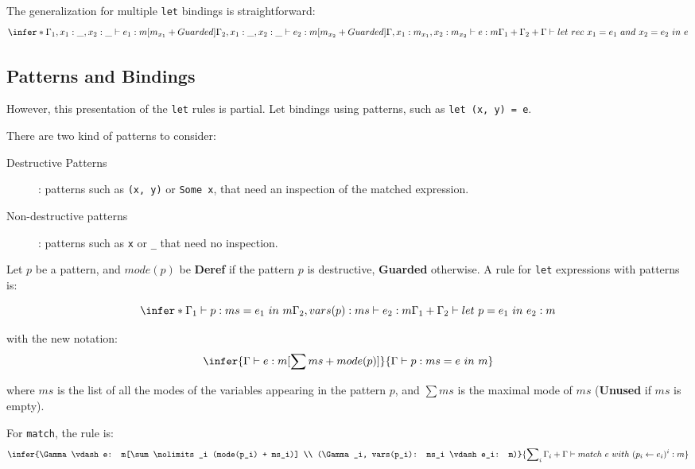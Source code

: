\documentclass{article}
\begin{document}
The generalization for multiple \verb"let" bindings is straightforward:
\begin{displaymath}
  \infer*{\Gamma_1, x_1: \_, x_2: \_ \vdash e_1: m[m_{x_1} + Guarded] \\\\
          \Gamma_2, x_1: \_, x_2: \_ \vdash e_2: m[m_{x_2} + Guarded] \\\\
          \Gamma, x_1: m_{x_1}, x_2: m_{x_2} \vdash e: m}
         {\Gamma_1 + \Gamma_2 + \Gamma \vdash
          let~rec~x_1 = e_1~and~x_2 = e_2~in~e}
\end{displaymath}

\subsection{Patterns and Bindings}
However, this presentation of the \verb"let" rules is partial. Let bindings
using patterns, such as \verb"let (x, y) = e".

There are two kind of patterns to consider:
\begin{description}
  \item[Destructive Patterns]: patterns such as \verb"(x, y)" or \verb"Some x",
    that need an inspection of the matched expression.
  \item[Non-destructive patterns]: patterns such as \verb"x" or \verb"_" that
    need no inspection.
\end{description}

Let $p$ be a pattern, and $mode(p)$ be \textbf{Deref} if the pattern $p$ is
destructive, \textbf{Guarded} otherwise. A rule for \verb"let" expressions with
patterns is:

\begin{displaymath}
  \infer*{\Gamma_1 \vdash p: ms=e_1~in~m \\
          \Gamma_2, vars(p): ms \vdash e_2: m}
         {\Gamma_1 + \Gamma_2 \vdash let~p=e_1~in~e_2: m}
\end{displaymath}

with the new notation:
\begin{displaymath}
  \infer{\Gamma \vdash e: m[\sum ms + mode(p)]}
        {\Gamma \vdash p:ms=e~in~m}
\end{displaymath}

where $ms$ is the list of all the modes of the variables appearing in the
pattern $p$, and $\sum ms$ is the maximal mode of $ms$ (\textbf{Unused} if $ms$
is empty).

For \verb"match", the rule is:
\begin{displaymath}
  \infer{\Gamma \vdash e: m[\sum\nolimits_i (mode(p_i) + ms_i)] \\
         (\Gamma_i, vars(p_i): ms_i \vdash e_i: m)}
        {\sum\nolimits_i \Gamma_i + \Gamma \vdash
         match~e~with~(p_i \leftarrow e_i)^i: m}
\end{displaymath}



\end{document}
